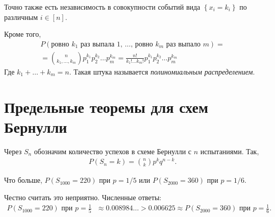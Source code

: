\documentclass[../main.tex]{subfiles}
\begin{document}
\begin{prop*}
 Точно также есть независимость в совокупности событий вида $\left\{ x_i = k_i \right\}$  по различным $i \in [n]$. 
\end{prop*}

\begin{prop*}
 Кроме того,
 \begin{align*}
  P(\text{ровно $k_1$ раз выпала $1$, \ldots, ровно $k_m$ раз выпало $m$}) = \\
  = \binom n {k_1,\ldots,k_m} p_1^{k_1} p_2^{k_2} \ldots p_m^{k_m} = \frac{n!}{k_1! \ldots k_m!} p_1^{k_1} p_2^{k_2} \ldots p_m^{k_m}
 \end{align*} Где $k_1 + \dots + k_m = n$. Такая штука называется \textit{полиномиальным распределением}.
\end{prop*}


\section{Предельные теоремы для схем Бернулли}

\begin{notatn*}
 Через $S_n$ обозначим количество успехов в схеме Бернулли с $n$ испытаниями. Так,
 \begin{align*}
  P(S_n = k) = \binom n k p^{k} q^{n-k}.
 \end{align*} 
\end{notatn*}

\begin{exmpl*}
 Что больше, $P(S_{1000} = 220)$ при $p = 1 / 5$ или $P(S_{2000} = 360)$ при $p = 1 / 6$.

 Честно считать это неприятно. Численные ответы:
 \begin{align*}
  P(S_{1000} = 220) \text{ при $p = \frac{1}{5}$ } \approx 0.008984\ldots > 0.006625 \approx P(S_{2000} = 360) \text{ при $p = \frac{1}{6}$}
 .\end{align*}
\end{exmpl*}
\end{document}
